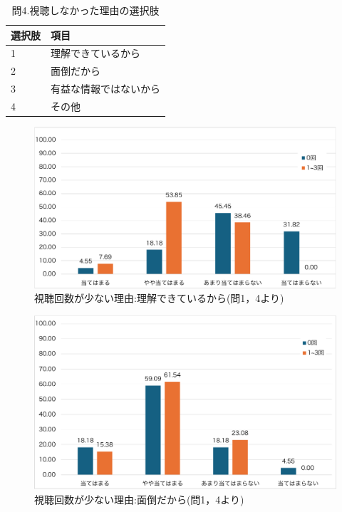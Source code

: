 \documentclass[12pt,a4j,titlepage]{ltjsarticle}
\begin{document}
\begin{table}[htbp]
  \caption{問4.視聴しなかった理由の選択肢}
  \begin{center}
\begin{tabular}{ll}\hline
選択肢 & 項目\\ \hline
               1 & 理解できているから\\
               2 & 面倒だから\\
               3 & 有益な情報ではないから\\
               4 & その他\\
               \hline
                \end{tabular}
                \end{center}
                \label{tb:anke2_7}
                \end{table}

\begin{figure}[!htb]
\centering
    \centering
    \includegraphics[width=1.0\columnwidth]{理解できているから.pdf}
    \caption{視聴回数が少ない理由:理解できているから(問1，4より)}
    \label{fig:rikai}
\end{figure}

\begin{figure}[!htb]
\centering
    \centering
    \includegraphics[width=1.0\columnwidth]{面倒だから.pdf}
    \caption{視聴回数が少ない理由:面倒だから(問1，4より)}
    \label{fig:mendo}
\end{figure}
\end{document}
